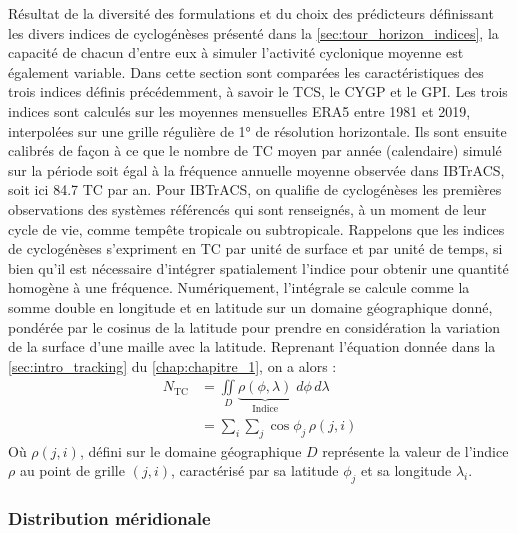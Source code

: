 \documentclass[../main.tex]{subfiles}
\begin{document}
Résultat de la diversité des formulations et du choix des prédicteurs définissant les divers indices de cyclogénèses présenté dans la
\cref{sec:tour_horizon_indices}, la capacité de chacun d'entre eux à simuler l'activité cyclonique moyenne est également variable. Dans cette section sont
comparées les caractéristiques des trois indices définis précédemment, à savoir le TCS, le CYGP et le GPI. Les trois indices sont calculés sur les moyennes
mensuelles ERA5 entre \num{1981} et \num{2019}, interpolées sur une grille régulière de \ang{1} de résolution horizontale. Ils sont ensuite calibrés de façon à
ce que le nombre de TC moyen par année (calendaire) simulé sur la période soit égal à la fréquence annuelle moyenne observée dans IBTrACS, soit ici \num{84.7}
TC par an. Pour IBTrACS, on qualifie de cyclogénèses les premières observations des systèmes référencés qui sont renseignés, à un moment de leur cycle de vie,
comme tempête tropicale ou subtropicale. Rappelons que les indices de cyclogénèses s'expriment en TC par unité de surface et par unité de temps, si bien qu'il
est nécessaire d'intégrer spatialement l'indice pour obtenir une quantité homogène à une fréquence. Numériquement, l'intégrale se calcule comme la somme double
en longitude et en latitude sur un domaine géographique donné, pondérée par le cosinus de la latitude pour prendre en considération la variation de la surface
d'une maille avec la latitude. Reprenant l'équation donnée dans la \cref{sec:intro_tracking} du \cref{chap:chapitre_1}, on a alors :
%
\begin{align*}
    N_{\mathrm{TC}} &= \iint\limits_{D} \underbrace{\rho(\phi, \lambda)}_{\text{Indice}} \; d\phi \, d\lambda \\
                    &= \sum_{i} \sum_{j} \cos \phi_j \, \rho (j, i) 
\end{align*}
%
Où $\rho(j,i)$, défini sur le domaine géographique $D$ représente la valeur de l'indice $\rho$ au point de grille $(j,i)$, caractérisé par sa latitude $\phi_j$
et sa longitude $\lambda_i$.

\subsubsection*{Distribution méridionale}
\end{document}
